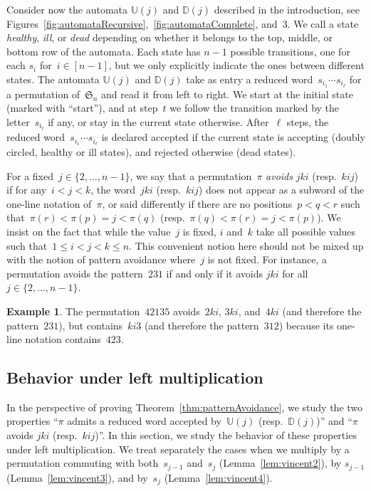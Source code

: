 \documentclass[11pt]{article}
\theoremstyle{definition}
\newtheorem{example}[theo]{Example}
\numberwithin{equation}{section}
\newcommand{\fS}{\mathfrak{S}}
\newcommand{\defn}[1]{\textsl{\color{darkblue} #1}}
\newcommand{\automatonU}{\mathbb{U}}
\newcommand{\automatonD}{\mathbb{D}}
\begin{document}
Consider now the automata $\automatonU(j)$ and $\automatonD(j)$ described in the introduction, see Figures~\ref{fig:automataRecursive},~\ref{fig:automataComplete}, and~3.
We call a state \defn{healthy}, \defn{ill}, or \defn{dead} depending on whether it belongs to the top, middle, or bottom row of the automata.
Each state has $n-1$ possible transitions, one for each $s_i$ for~$i \in [n-1]$, but we only explicitly indicate the ones between different states.
The automata $\automatonU(j)$ and $\automatonD(j)$ take as entry a reduced word~$s_{i_1} \cdots s_{i_\ell}$ for a permutation of~$\fS_n$ and read it from left to right.
We start at the initial state (marked with ``start''), and at step~$t$ we follow the transition marked by the letter~$s_{i_t}$ if any, or stay in the current state otherwise.
After~$\ell$ steps, the reduced word~$s_{i_1} \cdots s_{i_\ell}$ is declared accepted if the current state is accepting (doubly circled, healthy or ill states), and rejected otherwise (dead states).

For a fixed~$j \in \{2, \dots, n-1\}$, we say that a permutation~$\pi$ \defn{avoids} $jki$ (resp.~$kij$) if for any~$i < j < k$, the word~$jki$ (resp.~$kij$) does not appear as a subword of the one-line notation of~$\pi$, or said differently if there are no positions~$p < q < r$ such that~$\pi(r) < \pi(p) = j < \pi(q)$ (resp.~$\pi(q) < \pi(r) = j < \pi(p)$).
We insist on the fact that while the value~$j$ is fixed, $i$ and~$k$ take all possible values such that~$1 \le i < j < k \le n$.
This convenient notion here should not be mixed up with the notion of pattern avoidance where~$j$ is not fixed.
For instance, a permutation avoids the pattern~$231$ if and only if it avoids $jki$ for all~$j \in \{2, \dots, n-1\}$.

\begin{example}\label{exm:patternAvoidance}
	The permutation~$42135$ avoids~$2ki$, $3ki$, and~$4ki$ (and therefore the pattern~$231$), but contains~$ki3$ (and therefore the pattern~$312$) because its one-line notation contains~$423$. 
\end{example}

\subsection{Behavior under left multiplication}

In the perspective of proving Theorem~\ref{thm:patternAvoidance}, we study the two properties ``$\pi$ admits a reduced word accepted by~$\automatonU(j)$ (resp.~$\automatonD(j)$)'' and ``$\pi$ avoids $jki$ (resp.~$kij$)''.
In this section, we study the behavior of these properties under left multiplication.
We treat separately the cases when we multiply by a permutation commuting with both~$s_{j-1}$ and~$s_j$ (Lemma~\ref{lem:vincent2}), by $s_{j-1}$ (Lemma~\ref{lem:vincent3}), and by~$s_j$ (Lemma~\ref{lem:vincent4}).
\end{document}
